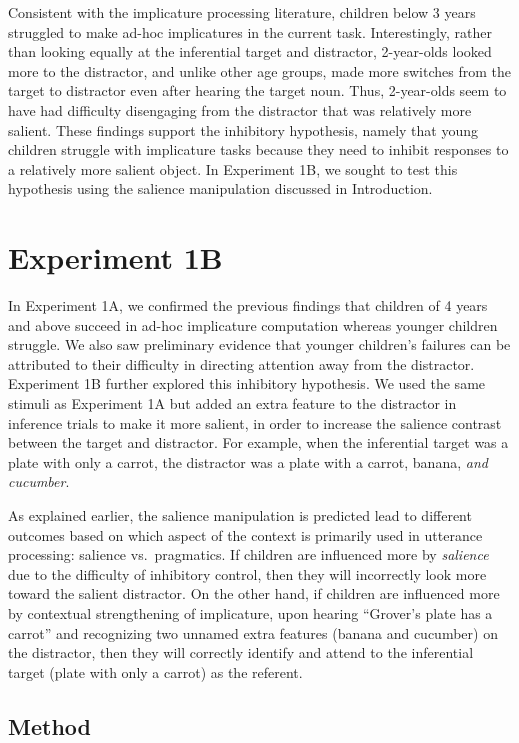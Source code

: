 \documentclass[a4paper,man,apacite,floatsintext]{apa6}
\begin{document}
Consistent with the implicature processing literature, children below 3
years struggled to make ad-hoc implicatures in the current task.
Interestingly, rather than looking equally at the inferential target and
distractor, 2-year-olds looked more to the distractor, and unlike other
age groups, made more switches from the target to distractor even after
hearing the target noun. Thus, 2-year-olds seem to have had difficulty
disengaging from the distractor that was relatively more salient. These
findings support the inhibitory hypothesis, namely that young children
struggle with implicature tasks because they need to inhibit responses
to a relatively more salient object. In Experiment 1B, we sought to test
this hypothesis using the salience manipulation discussed in
Introduction.

\section{Experiment 1B}\label{experiment-1b}

In Experiment 1A, we confirmed the previous findings that children of 4
years and above succeed in ad-hoc implicature computation whereas
younger children struggle. We also saw preliminary evidence that younger
children's failures can be attributed to their difficulty in directing
attention away from the distractor. Experiment 1B further explored this
inhibitory hypothesis. We used the same stimuli as Experiment 1A but
added an extra feature to the distractor in inference trials to make it
more salient, in order to increase the salience contrast between the
target and distractor. For example, when the inferential target was a
plate with only a carrot, the distractor was a plate with a carrot,
banana, \emph{and cucumber}.

As explained earlier, the salience manipulation is predicted lead to
different outcomes based on which aspect of the context is primarily
used in utterance processing: salience vs.~pragmatics. If children are
influenced more by \emph{salience} due to the difficulty of inhibitory
control, then they will incorrectly look more toward the salient
distractor. On the other hand, if children are influenced more by
contextual strengthening of implicature, upon hearing ``Grover's plate
has a carrot'' and recognizing two unnamed extra features (banana and
cucumber) on the distractor, then they will correctly identify and
attend to the inferential target (plate with only a carrot) as the
referent.

\subsection{Method}\label{method-1}
\end{document}
